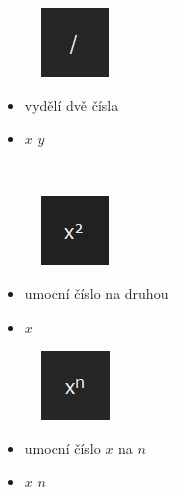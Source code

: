 \documentclass[a4paper, 12pt]{article}
\begin{document}
\begin{minipage}{0.07\textwidth}
\begin{figure}[H]
\includegraphics[scale=0.7]{div.jpg}
\end{figure}
\end{minipage}
\begin{minipage}{0.45\textwidth}
\begin{itemize}
\item vydělí dvě čísla
\item $x$  \keys{{/}}  $y$ \keys{=}
\end{itemize}
\end{minipage}
\\%
\begin{minipage}{0.07\textwidth}
\begin{figure}[H]
\includegraphics[scale=0.7]{x2.jpg}
\end{figure}
\end{minipage}
\begin{minipage}{0.45\textwidth}
\begin{itemize}
\item umocní číslo na druhou
\item $x$ 
\end{itemize}
\end{minipage}
\begin{minipage}{0.07\textwidth}
\begin{figure}[H]
\includegraphics[scale=0.7]{xn.jpg}
\end{figure}
\end{minipage}
\begin{minipage}{0.45\textwidth}
\begin{itemize}
\item umocní číslo $x$ na $n$
\item $x$  $n$ \keys{=}
\end{itemize}
\end{minipage}
\end{document}
